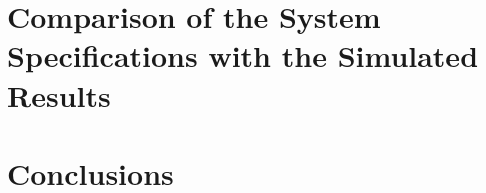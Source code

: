 \documentclass[12pt]{report} %
\begin{document}
\section{Comparison of the System Specifications with the Simulated Results}

\section{Conclusions} %


























\clearpage
{}
\printbibliography



\end{document}
